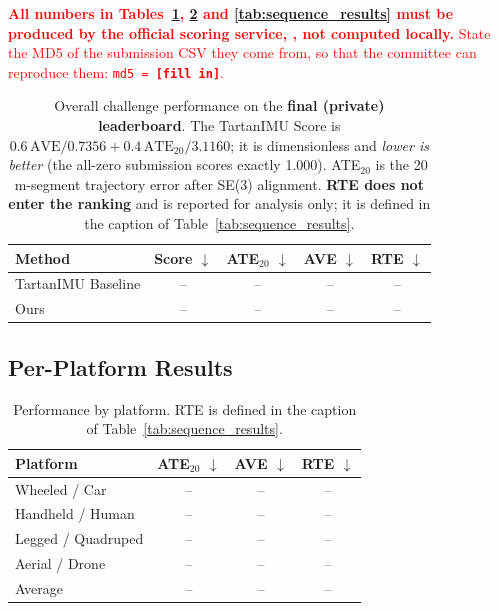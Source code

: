 \documentclass[letterpaper,10pt,conference]{ieeeconf}
\begin{document}
\noindent\textcolor{red}{\textbf{All numbers in Tables~\ref{tab:overall_results},
\ref{tab:platform_results} and \ref{tab:sequence_results} must be produced by the official
scoring service, \scoringurl, not computed locally.} State the MD5 of
the submission CSV they come from, so that the committee can reproduce them:
\texttt{md5 = \textbf{[fill in]}}.}

\begin{table}[htbp]
    \centering
    \footnotesize
    \caption{Overall challenge performance on the \textbf{final (private) leaderboard}.
    The TartanIMU Score is $0.6\,\mathrm{AVE}/0.7356 + 0.4\,\mathrm{ATE}_{20}/3.1160$;
    it is dimensionless and \emph{lower is better} (the all-zero submission scores exactly
    1.000). ATE$_{20}$ is the 20\,m-segment trajectory error after SE(3) alignment.
    \textbf{RTE does not enter the ranking} and is reported for analysis only; it is defined
    in the caption of Table~\ref{tab:sequence_results}.}
    \setlength{\tabcolsep}{3.5pt}
    \begin{tabular}{lcccc}
        \toprule
        Method & Score $\downarrow$ & ATE$_{20}$ $\downarrow$ & AVE $\downarrow$ & RTE $\downarrow$ \\
        \midrule
        TartanIMU Baseline & -- & -- & -- & -- \\
        Ours & -- & -- & -- & -- \\
        \bottomrule
    \end{tabular}
    
    \label{tab:overall_results}
\end{table}

\subsection{Per-Platform Results}

\begin{table}[htbp]
    \centering
    \footnotesize
    \caption{Performance by platform. RTE is defined in the caption of
    Table~\ref{tab:sequence_results}.}
    \begin{tabular}{lccc}
        \toprule
        Platform & ATE$_{20}$ $\downarrow$ & AVE $\downarrow$ & RTE $\downarrow$ \\
        \midrule
        Wheeled / Car & -- & -- & -- \\
        Handheld / Human & -- & -- & -- \\
        Legged / Quadruped & -- & -- & -- \\
        Aerial / Drone & -- & -- & -- \\
        \midrule
        Average & -- & -- & -- \\
        \bottomrule
    \end{tabular}
    
    \label{tab:platform_results}
\end{table}
\end{document}
